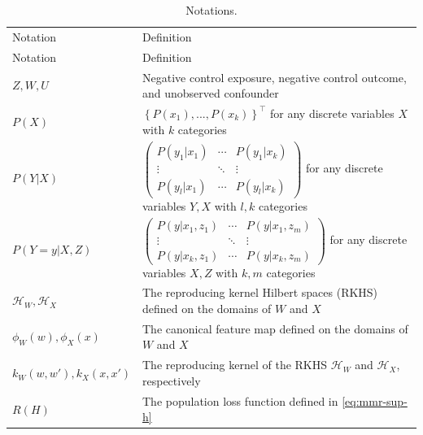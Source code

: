 \documentclass[
  12pt]{article}
\def\cH{\mathcal{H}}
\begin{document}
{\renewcommand{\arraystretch}{1.5}
\begin{longtable}{ >{\centering\arraybackslash}m{3.4cm} | >{\centering\arraybackslash}m{12.2cm} } 
\caption{Notations.}
\renewcommand*{\arraystretch}{1.5}
\\ %
\hline\hline
Notation & Definition \\ 
\hline
\endfirsthead %

\hline
Notation & Definition \\ 
\hline
\endhead %

\hline
\endfoot %

\hline\hline
\endlastfoot %

 $Z,W, U$ & Negative control exposure, negative control outcome, and unobserved confounder \\ 
 
 $P(X)$ & $\left\{P(x_1),...,P(x_k)\right\}^\top$ for any discrete variables $X$ with $k$ categories \\


 $P(Y|X) $ &  $\begin{pmatrix}
	P( y_1|x_1)&		\cdots&		P( y_1|x_k)\\
	\vdots&		\ddots&		\vdots\\
	P( y_l|x_1)&		\cdots&		P( y_l|x_k)
\end{pmatrix}$ for any discrete variables $Y,X$ with $l,k$ categories \\

 $P(Y=y|X,Z)$ &  $ \begin{pmatrix}
	P( y|x_1,z_1)&		\cdots&		P( y|x_1,z_m)\\
	\vdots&		\ddots&		\vdots\\
	P( y|x_k,z_1)&		\cdots&		P( y|x_k,z_m )
\end{pmatrix} $ for any discrete variables $X,Z$ with $k,m$ categories \\


\hline
$\cH_W,\cH_X$ & The reproducing kernel Hilbert spaces (RKHS) defined on the domains of $W$ and $X$\\

$\phi_W(w),\phi_X(x)$ & The canonical feature map defined on the domains of $W$ and $X$ \\

$k_W(w,w'),k_X(x,x')$ & The reproducing kernel of the RKHS $\cH_W$ and $\cH_X$, respectively \\

$R(H)$ & The population loss function defined in \eqref{eq:mmr-sup-h} \\


\end{longtable}}
\end{document}
